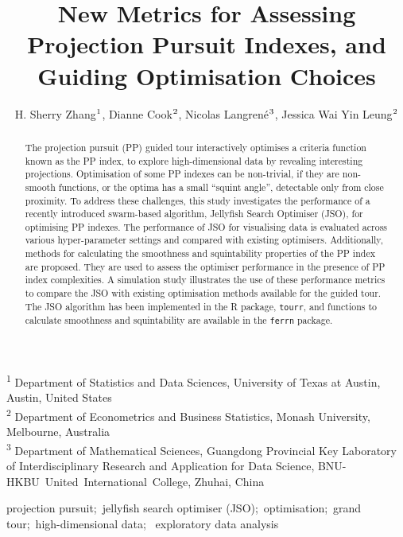 \documentclass[
  12pt,
]{interact}
\title{New Metrics for Assessing Projection Pursuit Indexes, and Guiding
Optimisation Choices}
\author{H. Sherry Zhang$\textsuperscript{1}$, Dianne
Cook$\textsuperscript{2}$, Nicolas
Langrené$\textsuperscript{3}$, Jessica Wai Yin
Leung$\textsuperscript{2}$}
\theoremstyle{plain}
\begin{document}
\captionsetup{labelsep=space}
\maketitle
\textsuperscript{1} Department of Statistics and Data
Sciences, University of Texas at Austin, Austin, United
States\\ \textsuperscript{2} Department of Econometrics and Business
Statistics, Monash
University, Melbourne, Australia\\ \textsuperscript{3} Department of
Mathematical Sciences, Guangdong Provincial Key Laboratory of
Interdisciplinary Research and Application for Data Science,
BNU-HKBU~United~International~College, Zhuhai, China
\begin{abstract}
The projection pursuit (PP) guided tour interactively optimises a
criteria function known as the PP index, to explore high-dimensional
data by revealing interesting projections. Optimisation of some PP
indexes can be non-trivial, if they are non-smooth functions, or the
optima has a small ``squint angle'', detectable only from close
proximity. To address these challenges, this study investigates the
performance of a recently introduced swarm-based algorithm, Jellyfish
Search Optimiser (JSO), for optimising PP indexes. The performance of
JSO for visualising data is evaluated across various hyper-parameter
settings and compared with existing optimisers. Additionally, methods
for calculating the smoothness and squintability properties of the PP
index are proposed. They are used to assess the optimiser performance in
the presence of PP index complexities. A simulation study illustrates
the use of these performance metrics to compare the JSO with existing
optimisation methods available for the guided tour. The JSO algorithm
has been implemented in the R package, \texttt{tourr}, and functions to
calculate smoothness and squintability are available in the
\texttt{ferrn} package.
\end{abstract}
\begin{keywords}
\def\sep{;\ }
projection pursuit\sep jellyfish search optimiser
(JSO)\sep optimisation\sep grand tour\sep high-dimensional data\sep 
exploratory data analysis
\end{keywords}
\ifdefined\Shaded\renewenvironment{Shaded}{\begin{tcolorbox}[boxrule=0pt, interior hidden, breakable, enhanced, frame hidden, borderline west={3pt}{0pt}{shadecolor}, sharp corners]}{\end{tcolorbox}}\fi
\end{document}
